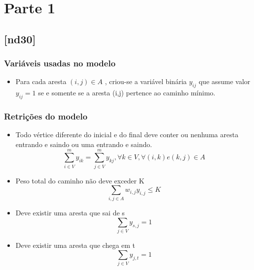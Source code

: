 \documentclass[11pt,letterpaper]{article}
\begin{document}
 
\section{Parte 1}

\subsection{{[}nd30{]}}
\subsubsection*{Variáveis usadas no modelo}
\begin{itemize}
\item Para cada aresta $(i,j) \in A$ , criou-se
a variável binária $y_{ij}$ que assume valor $y_{ij}=1$ se e somente se a aresta (i,j)
pertence ao caminho mínimo.
\end{itemize}

\subsubsection*{Retrições do modelo}
\begin{itemize}

\item Todo vértice diferente do inicial e do final deve conter ou
  nenhuma aresta entrando e saindo ou uma entrando e saindo.
\begin{equation*}
  \sum_{i \in V}^{m}y_{ik}=\sum_{j \in V}^{m}y_{kj}, \forall k \in V,
  \forall (i,k) e (k,j) \in A 
\end{equation*}

\item Peso total do caminho não deve exceder K
\begin{equation*}
\sum_{{i,j} \in A}w_{i,j}y_{i,j} \leq K
\end{equation*}

\item Deve existir uma aresta que sai de s
\begin{equation*}
\sum_{j \in V}y_{s,j} = 1 
\end{equation*}

\item Deve existir uma aresta que chega em t
\begin{equation*}
\sum_{j \in V}y_{j,t} = 1 
\end{equation*}

\end{itemize}
\end{document}
